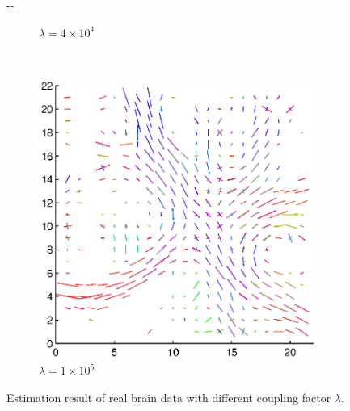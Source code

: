 \documentclass{article}
\begin{document}
\begin{figure}[H]
\begin{adjustwidth}{-\oddsidemargin}{-\rightmargin}
\begin{subfigure}{0.3\paperwidth}
    \caption{$\lambda=4\times 10^4$}
  \end{subfigure}
  ~
  \begin{subfigure}{0.3\paperwidth}
    \includegraphics[width=\textwidth]{figures/brain_bas_s=1e5.eps}
    \caption{$\lambda=1\times 10^5$}
  \end{subfigure}
  \end{adjustwidth}
  \caption{Estimation result of real brain data with different coupling factor $\lambda$.}
  \label{fig:roi}
\end{figure}



\end{document}
